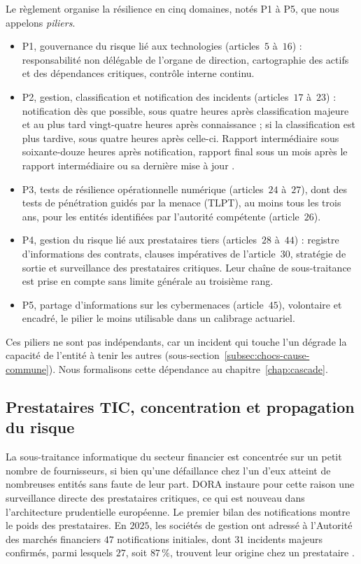 Le règlement organise la résilience en cinq domaines, notés P1 à P5, que nous appelons \emph{piliers}.
\begin{itemize}[leftmargin=1.4em,itemsep=2pt]
\item P1, gouvernance du risque lié aux technologies (articles~$5$ à~$16$) : responsabilité non
      délégable de l'organe de direction, cartographie des actifs et des dépendances critiques,
      contrôle interne continu.
\item P2, gestion, classification et notification des incidents (articles~$17$ à~$23$) : notification dès que possible, sous quatre heures après classification majeure et au plus tard vingt-quatre heures après connaissance ; si la classification est plus tardive, sous quatre heures après celle-ci. Rapport intermédiaire sous soixante-douze heures après notification, rapport final sous un mois après le rapport intermédiaire ou sa dernière mise à jour \citep{eu2025_301}.
\item P3, tests de résilience opérationnelle numérique (articles~$24$ à~$27$), dont des tests de
      pénétration guidés par la menace (TLPT), au moins tous les trois ans, pour les entités
      identifiées par l'autorité compétente (article~$26$).
\item P4, gestion du risque lié aux prestataires tiers (articles~$28$ à~$44$) : registre
      d'informations des contrats, clauses impératives de l'article~$30$, stratégie de sortie et
      surveillance des prestataires critiques. Leur chaîne de sous-traitance est prise en compte sans limite générale au troisième rang.
\item P5, partage d'informations sur les cybermenaces (article~$45$), volontaire et encadré, le
      pilier le moins utilisable dans un calibrage actuariel.
\end{itemize}
Ces piliers ne sont pas indépendants, car un incident qui touche l'un dégrade la capacité de l'entité à tenir les autres (sous-section~\ref{subsec:chocs-cause-commune}). Nous formalisons cette dépendance au chapitre~\ref{chap:cascade}.

\subsection{Prestataires TIC, concentration et propagation du risque}
\label{subsec:risque-tiers-dora}

La sous-traitance informatique du secteur financier est concentrée sur un petit nombre de
fournisseurs, si bien qu'une défaillance chez l'un d'eux atteint de nombreuses entités sans faute de
leur part. DORA instaure pour cette raison une surveillance directe des prestataires critiques, ce qui
est nouveau dans l'architecture prudentielle européenne. Le premier bilan des notifications montre
le poids des prestataires. En $2025$, les sociétés de gestion ont adressé à l'Autorité des marchés
financiers $47$ notifications initiales, dont $31$ incidents majeurs confirmés, parmi lesquels $27$,
soit $87\,\%$, trouvent leur origine chez un prestataire \citep{amf2026incidents}.

